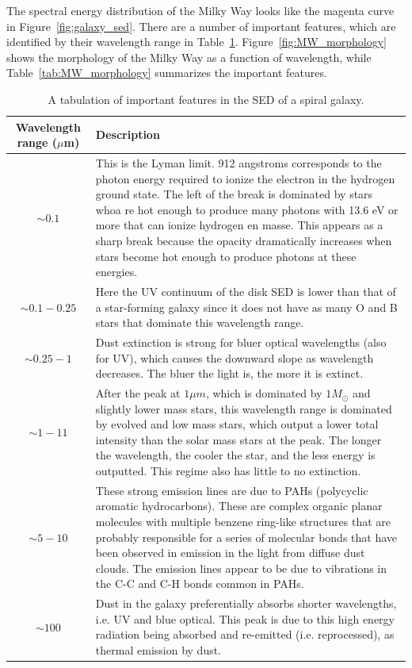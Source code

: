 \begin{enumerate}
    The spectral energy distribution of the Milky Way looks like the magenta curve in
    Figure~\ref{fig:galaxy_sed}.  There are a number of important features, which are
    identified by their wavelength range in Table~\ref{tab:galaxy_sed}.
    Figure~\ref{fig:MW_morphology} shows the morphology of the Milky Way as a function of
    wavelength, while Table~\ref{tab:MW_morphology} summarizes the important features.

    \begin{table}[p]
    \centering
    \begin{tabular}{cp{4in}}
    \toprule
    Wavelength range ($\mu$m) & Description \\
    \midrule
    $\sim0.1$ &
        This is the Lyman limit.  912 angstroms corresponds to the photon energy required to
        ionize the electron in the hydrogen ground state.  The left of the break is dominated by
        stars whoa re hot enough to produce many photons with 13.6 eV or more that can ionize
        hydrogen en masse.  This appears as a sharp break because the opacity dramatically
        increases when stars become hot enough to produce photons at these energies. \\
    $\sim0.1 - 0.25$ &
        Here the UV continuum of the disk SED is lower than that of a star-forming galaxy
        since it does not have as many O and B stars that dominate this wavelength range. \\
    $\sim0.25 - 1$ &
        Dust extinction is strong for bluer optical wavelengths (also for UV), which causes the
        downward slope as wavelength decreases.  The bluer the light is, the more it is extinct. \\
    $\sim1-11$ &
        After the peak at $1 \mu m$, which is dominated by $1 M_\odot$ and slightly lower mass
        stars, this wavelength range is dominated by evolved and low mass stars, which output a
        lower total intensity than the solar mass stars at the peak.  The longer the wavelength,
        the cooler the star, and the less energy is outputted.  This regime also has little to
        no extinction. \\
    $\sim5-10$ &
        These strong emission lines are due to PAHs (polycyclic aromatic hydrocarbons).  These
        are complex organic planar molecules with multiple benzene ring-like structures that are
        probably responsible for a series of molecular bonds that have been observed in emission
        in the light from diffuse dust clouds.  The emission lines appear to be due to vibrations
        in the C-C and C-H bonds common in PAHs. \\
    $\sim100$ &
        Dust in the galaxy preferentially absorbs shorter wavelengths, i.e. UV and blue optical.
        This peak is due to this high energy radiation being absorbed and re-emitted
        (i.e. reprocessed), as thermal emission by dust. \\
    \bottomrule
    \end{tabular}
    \caption{A tabulation of important features in the SED of a spiral galaxy.}
    \label{tab:galaxy_sed}
    \end{table}


\end{enumerate}

